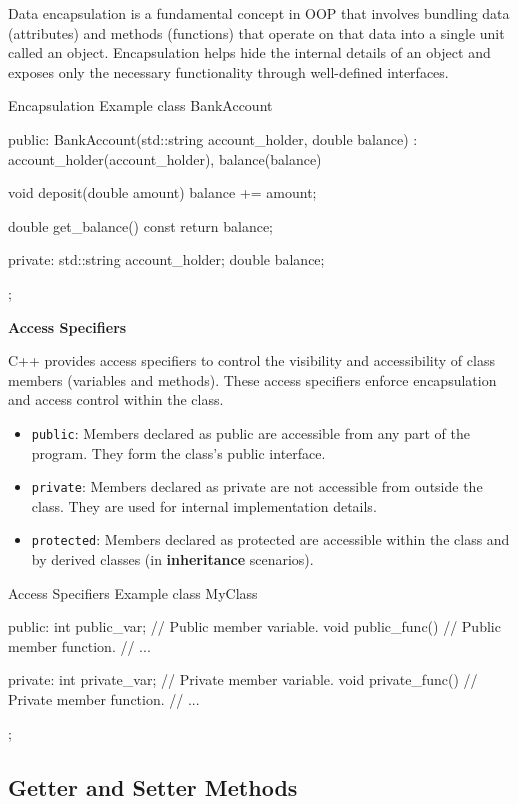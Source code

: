 Data encapsulation is a fundamental concept in OOP that involves bundling data (attributes) and methods (functions) that operate on that data into a single unit called an object. Encapsulation helps hide the internal details of an object and exposes only the necessary functionality through well-defined interfaces.

\begin{neonlisting}[language=C++]{Encapsulation Example}
class BankAccount {
public:
    BankAccount(std::string account_holder, double balance) : account_holder(account_holder), balance(balance) {}

    void deposit(double amount) {
        balance += amount;
    }

    double get_balance() const {
        return balance;
    }

private:
    std::string account_holder;
    double balance;
};
\end{neonlisting}

\textbf{Access Specifiers}

C++ provides access specifiers to control the visibility and accessibility of class members (variables and methods). These access specifiers enforce encapsulation and access control within the class.

\begin{itemize}
    \item \texttt{public}: Members declared as public are accessible from any part of the program. They form the class's public interface.
    \item \texttt{private}: Members declared as private are not accessible from outside the class. They are used for internal implementation details.
    \item \texttt{protected}: Members declared as protected are accessible within the class and by derived classes (in \textbf{inheritance} scenarios).
\end{itemize}

\begin{neonlisting}[language=C++]{Access Specifiers Example}
class MyClass {
public:
    int public_var;    // Public member variable.
    void public_func() { // Public member function.
        // ...
    }

private:
    int private_var;    // Private member variable.
    void private_func() { // Private member function.
        // ...
    }
};
\end{neonlisting}

\subsection{Getter and Setter Methods}

